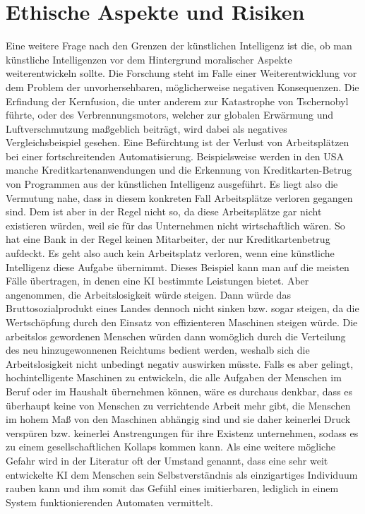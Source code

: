 \section{Ethische Aspekte und Risiken}
Eine weitere Frage nach den Grenzen der künstlichen Intelligenz ist die, ob man künstliche Intelligenzen vor dem Hintergrund moralischer Aspekte weiterentwickeln sollte.
Die Forschung steht im Falle einer Weiterentwicklung vor dem Problem der unvorhersehbaren, möglicherweise negativen Konsequenzen.
Die Erfindung der Kernfusion, die unter anderem zur Katastrophe von Tschernobyl führte, oder des Verbrennungsmotors, welcher zur globalen Erwärmung und Luftverschmutzung maßgeblich beiträgt, wird dabei als negatives Vergleichsbeispiel gesehen.
Eine Befürchtung ist der Verlust von Arbeitsplätzen bei einer fortschreitenden Automatisierung.
Beispielsweise werden in den USA manche Kreditkartenanwendungen und die Erkennung von Kreditkarten-Betrug von Programmen aus der künstlichen Intelligenz ausgeführt.
Es liegt also die Vermutung nahe, dass in diesem konkreten Fall Arbeitsplätze verloren gegangen sind.
Dem ist aber in der Regel nicht so, da diese Arbeitsplätze gar nicht existieren würden, weil sie für das Unternehmen nicht wirtschaftlich wären.
So hat eine Bank in der Regel keinen Mitarbeiter, der nur Kreditkartenbetrug aufdeckt.
Es geht also auch kein Arbeitsplatz verloren, wenn eine künstliche Intelligenz diese Aufgabe übernimmt.
Dieses Beispiel kann man auf die meisten Fälle übertragen, in denen eine KI bestimmte Leistungen bietet.
Aber angenommen, die Arbeitslosigkeit würde steigen.
Dann würde das Bruttosozialprodukt eines Landes dennoch nicht sinken bzw.
sogar steigen, da die Wertschöpfung durch den Einsatz von effizienteren Maschinen steigen
würde.
Die arbeitslos gewordenen Menschen würden dann womöglich durch die Verteilung
des neu hinzugewonnenen Reichtums bedient werden, weshalb sich die Arbeitslosigkeit nicht unbedingt negativ auswirken müsste.
Falls es aber gelingt, hochintelligente Maschinen zu entwickeln, die alle Aufgaben der Menschen im Beruf oder im Haushalt übernehmen können, wäre es durchaus denkbar, dass es überhaupt keine von Menschen zu verrichtende Arbeit mehr gibt, die Menschen im hohem Maß von den Maschinen abhängig sind und sie daher keinerlei Druck verspüren bzw.
keinerlei Anstrengungen für ihre Existenz unternehmen, sodass es zu einem gesellschaftlichen Kollaps kommen kann.
Als eine weitere mögliche Gefahr wird in der Literatur oft der Umstand genannt, dass eine sehr weit entwickelte KI dem Menschen sein Selbstverständnis als einzigartiges Individuum rauben kann und ihm somit das Gefühl eines imitierbaren, lediglich in einem System funktionierenden Automaten vermittelt.
